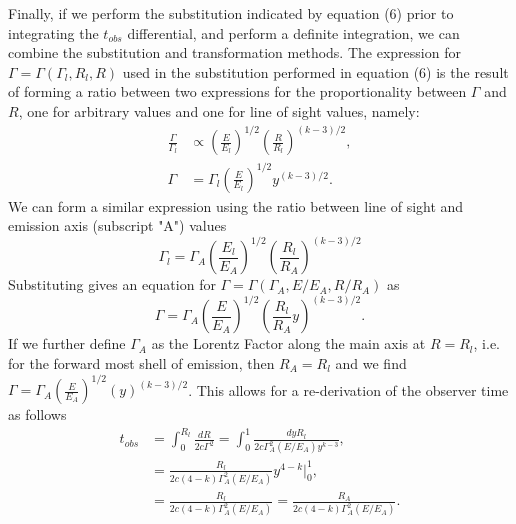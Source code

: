\documentclass[11pt,twoside,letterpaper]{report}
\begin{document}
Finally, if we perform the substitution indicated by equation (6) prior to integrating the $t_{obs}$ differential, and perform a definite integration, we can combine the substitution and transformation methods. The expression for $\Gamma = \Gamma(\Gamma_l, R_l, R)$ used in the substitution performed in equation (6) is the result of forming a ratio between two expressions for the proportionality between $\Gamma$ and $R$, one for arbitrary values and one for line of sight values, namely:
\begin{align}
\frac{\Gamma}{\Gamma_l} &\propto \left(\frac{E}{E_l}\right)^{1/2}\left(\frac{R}{R_l}\right)^{(k-3)/2}, \\
\Gamma &= \Gamma_l \left(\frac{E}{E_l}\right)^{1/2}y^{(k-3)/2}.
\end{align}
We can form a similar expression using the ratio between line of sight and emission axis (subscript "A") values
\begin{equation}
\Gamma_l = \Gamma_A \left(\frac{E_l}{E_A}\right)^{1/2}\left(\frac{R_l}{R_A}\right)^{(k-3)/2}
\end{equation}
Substituting gives an equation for $\Gamma = \Gamma(\Gamma_A, E/E_A, R/R_A)$ as
\begin{equation}
\Gamma = \Gamma_A \left(\frac{E}{E_A}\right)^{1/2} \left( \frac{R_l}{R_A} y \right) ^{(k-3)/2}.
\end{equation}
If we further define $\Gamma_A$ as the Lorentz Factor along the main axis at $R=R_l$, i.e. for the forward most shell of emission, then $R_A = R_l$ and we find $\Gamma = \Gamma_A \left(\frac{E}{E_A}\right)^{1/2} \left( y \right) ^{(k-3)/2}$.
This allows for a re-derivation of the observer time as follows
\begin{align}
t_{obs} &= \int_0^{R_l} \frac{dR}{2c\Gamma^2} = \int_0^1 \frac{dy R_l}{2c\Gamma_A^2 (E/E_A) y^{k-3}}, \\
&= \frac{R_l}{2c(4-k)\Gamma_A^2 (E/E_A) } y^{4-k} \biggr\rvert_0^1, \\
&= \frac{R_l}{2c(4-k)\Gamma_A^2 (E/E_A)} = \frac{R_A}{2c(4-k)\Gamma_A^2 (E/E_A)}.
\end{align}
\end{document}
